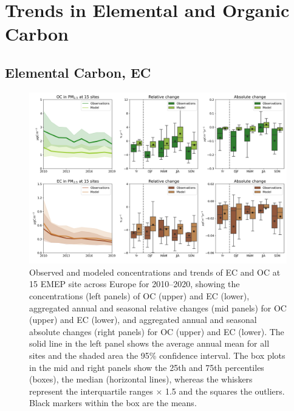 \section{Trends in Elemental and Organic Carbon}
\label{sec:trendsECOC}
\subsection{Elemental Carbon, EC}
\label{ss:trendsEC}


\begin{figure}
\includegraphics[width=16cm]{FIGS_TRENDS/ECOC_trends.png}
\caption{Observed and modeled concentrations and trends of EC and OC at 15 EMEP
  site across Europe for 2010--2020, showing the concentrations
  (left panels) of OC (upper) and EC (lower), aggregated annual and
  seasonal relative changes (mid panels) for OC (upper) and EC (lower),
  and aggregated annual and seasonal absolute changes (right panels)
  for OC (upper) and EC (lower). The solid line in the left panel shows
  the average annual mean for all sites and the shaded area the 95\%
  confidence interval. The box plots in the mid and right panels show
  the 25th and 75th percentiles (boxes), the median (horizontal lines),
  whereas the whiskers represent the interquartile ranges $\times$
  1.5 and the squares the outliers. Black markers within the box are
  the means.\label{fig:KEX1}
}
\end{figure}

